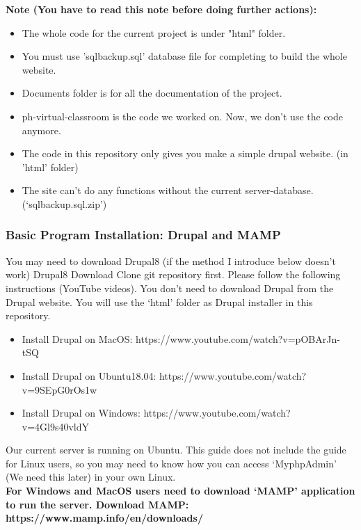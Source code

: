 \documentclass[10pt]{article}
\begin{document}
            \medskip \medskip \medskip
            \textbf{Note (You have to read this note before doing further actions):}
            \begin{itemize}
                \item The whole code for the current project is under "html" folder.
                \item You must use 'sqlbackup.sql' database file for completing to build the whole website.
                \item Documents folder is for all the documentation of the project.
                \item ph-virtual-classroom is the code we worked on. Now, we don't use the code anymore.
                \item The code in this repository only gives you make a simple drupal website. (in 'html' folder)
                \item The site can't do any functions without the current server-database. (`sqlbackup.sql.zip')
            \end{itemize}

        \subsubsection{Basic Program Installation: Drupal and MAMP}
            You may need to download Drupal8 (if the method I introduce below doesn't work) Drupal8 Download Clone git repository first. Please follow the following instructions (YouTube videos). You don't need to download Drupal from the Drupal website. You will use the  `html' folder as Drupal installer in this repository.
                \begin{itemize}
                    \item Install Drupal on MacOS: https://www.youtube.com/watch?v=pOBArJn-tSQ
                    \item Install Drupal on Ubuntu18.04: https://www.youtube.com/watch?v=9SEpG0rOs1w
                    \item Install Drupal on Windows: https://www.youtube.com/watch?v=4Gl9s40vldY
                \end{itemize}
            Our current server is running on Ubuntu. This guide does not include the guide for Linux users, so you may need to know how you can access `MyphpAdmin’ (We need this later) in your own Linux. \\
            \textbf{For Windows and MacOS users need to download `MAMP’ application to run the server. Download MAMP: https://www.mamp.info/en/downloads/}
\end{document}

